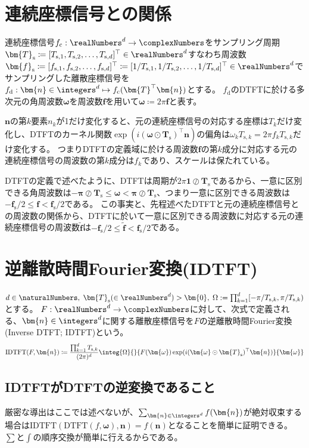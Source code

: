 			\section{連続座標信号との関係}
				連続座標信号$f_\text{c}:\realNumbers^d\to\complexNumbers$をサンプリング周期$\bm{T}_\text{s} \coloneqq [T_{\text{s},1}, T_{\text{s},2}, \dotsc, T_{\text{s},d}]^\top\in\realNumbers^d$すなわち周波数$\bm{f}_\text{s} \coloneqq [f_{\text{s},1}, f_{\text{s},2}, \dotsc, f_{\text{s},d}]^\top \coloneqq [1/T_{\text{s},1}, 1/T_{\text{s},2}, \dotsc, 1/T_{\text{s},d}]^\top\in\realNumbers^d$でサンプリングした離散座標信号を$f_\text{d}: \bm{n}\in\integers^d\mapsto f_\text{c}(\bm{T}^\top\bm{n})$とする。
				$f_\text{d}$のDTFTに於ける多次元の角周波数$\bm{\omega}$を周波数$\bm{f}$を用いて$\bm{\omega} \coloneqq 2\pi\bm{f}$と表す。
				\par
				$\bm{n}$の第$k$要素$n_k$が1だけ変化すると、元の連続座標信号の対応する座標は$T_k$だけ変化し、DTFTのカーネル関数$\exp(i(\bm{\omega}\odot\bm{T}_\text{s})^\top\bm{n})$の偏角は$\omega_k T_{\text{s},k} = 2\pi f_k T_{\text{s},k}$だけ変化する。
				つまりDTFTの定義域に於ける周波数$\bm{f}$の第$k$成分に対応する元の連続座標信号の周波数の第$k$成分は$f_k$であり、スケールは保たれている。
				\par
				DTFTの定義で述べたように、DTFTは周期が$2\pi\bm{1}\oslash\bm{T}_\text{s}$であるから、一意に区別できる角周波数は$-\bm{\pi}\oslash\bm{T}_\text{s} \leq \bm{\omega} < \bm{\pi}\oslash\bm{T}_\text{s}$、つまり一意に区別できる周波数は$-\bm{f}_\text{s}/2 \leq \bm{f} < \bm{f}_\text{s}/2$である。
				この事実と、先程述べたDTFTと元の連続座標信号との周波数の関係から、DTFTに於いて一意に区別できる周波数に対応する元の連続座標信号の周波数$\tilde{\bm{f}}$は$-\bm{f}_\text{s}/2 \leq \tilde{\bm{f}} < \bm{f}_\text{s}/2$である。
			\section{逆離散時間Fourier変換(IDTFT)}
				$d\in\naturalNumbers,\;\bm{T}_\text{s}(\in\realNumbers^d)>\bm{0},\;\Omega := \prod_{k=1}^d [-\pi/T_{\text{s},k},\pi/T_{\text{s},k})$とする。
				$F:\realNumbers^d\to\complexNumbers$に対して、次式で定義される、$\bm{n}\in\integers^d$に関する離散座標信号を$F$の逆離散時間Fourier変換(Inverse DTFT; IDTFT)という。
				\[ \text{IDTFT}(F,\bm{n}) \coloneqq \frac{\prod_{k=1}^d T_{\text{s},k}}{(2\pi)^d}\integ{\Omega}{}{F(\bm{\omega})\exp(i(\bm{\omega}\odot\bm{T}_\text{s})^\top\bm{n})}{\bm{\omega}} \]
				\subsection{IDTFTがDTFTの逆変換であること}
					厳密な導出はここでは述べないが、$\sum_{\bm{n}\in\integers^d} f(\bm{n})$が絶対収束する場合は$\text{IDTFT}(\text{DTFT}(f,\bm{\omega}),\bm{n}) = f(\bm{n})$となることを簡単に証明できる。
					$\sum$と$\int$の順序交換が簡単に行えるからである。
